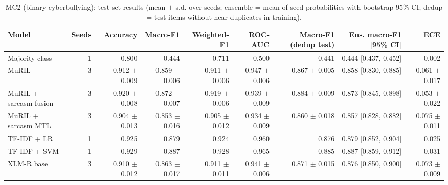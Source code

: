\begin{table}[t]
\centering
\small
\caption{MC2 (binary cyberbullying): test-set results (mean $\pm$ s.d. over seeds; ensemble = mean of seed probabilities with bootstrap 95\% CI; dedup = test items without near-duplicates in training).}
\label{tab:tab08_results_mc2}
\begin{tabular}{lrrrrrrrr}
\toprule
Model & Seeds & Accuracy & Macro-F1 & Weighted-F1 & ROC-AUC & Macro-F1 (dedup test) & Ens. macro-F1 [95\% CI] & ECE \\
\midrule
Majority class & 1 & 0.800 & 0.444 & 0.711 & 0.500 & 0.441 & 0.444 [0.437, 0.452] & 0.002 \\
MuRIL & 3 & 0.912 $\pm$ 0.009 & 0.859 $\pm$ 0.006 & 0.911 $\pm$ 0.006 & 0.947 $\pm$ 0.006 & 0.867 $\pm$ 0.005 & 0.858 [0.830, 0.885] & 0.061 $\pm$ 0.017 \\
MuRIL + sarcasm fusion & 3 & 0.920 $\pm$ 0.008 & 0.872 $\pm$ 0.007 & 0.919 $\pm$ 0.006 & 0.939 $\pm$ 0.009 & 0.884 $\pm$ 0.009 & 0.873 [0.845, 0.898] & 0.053 $\pm$ 0.022 \\
MuRIL + sarcasm MTL & 3 & 0.904 $\pm$ 0.013 & 0.853 $\pm$ 0.016 & 0.905 $\pm$ 0.012 & 0.934 $\pm$ 0.009 & 0.860 $\pm$ 0.018 & 0.857 [0.828, 0.882] & 0.075 $\pm$ 0.011 \\
TF-IDF + LR & 1 & 0.925 & 0.879 & 0.924 & 0.960 & 0.876 & 0.879 [0.852, 0.904] & 0.025 \\
TF-IDF + SVM & 1 & 0.929 & 0.887 & 0.928 & 0.965 & 0.885 & 0.887 [0.859, 0.912] & 0.031 \\
XLM-R base & 3 & 0.910 $\pm$ 0.012 & 0.863 $\pm$ 0.017 & 0.911 $\pm$ 0.011 & 0.941 $\pm$ 0.006 & 0.871 $\pm$ 0.015 & 0.876 [0.850, 0.900] & 0.073 $\pm$ 0.009 \\
\bottomrule
\end{tabular}
\end{table}
